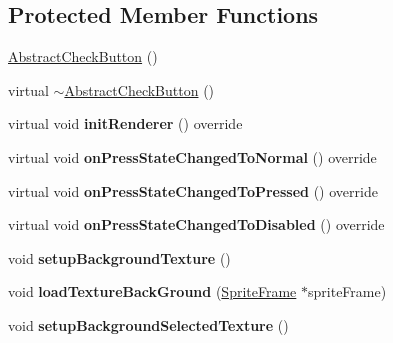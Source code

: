\subsection*{Protected Member Functions}
\begin{DoxyCompactItemize}
\item 
\hyperlink{classui_1_1AbstractCheckButton_a951d897f8066270c55a7744951b7eae1}{Abstract\+Check\+Button} ()
\item 
virtual \hyperlink{classui_1_1AbstractCheckButton_a85c1aaf7ad26be411cf5ca0d4c64b6d4}{$\sim$\+Abstract\+Check\+Button} ()
\item 
\mbox{\label{classui_1_1AbstractCheckButton_a2698a4a8e930e360a95760ba34f8912a}} 
virtual void {\bfseries init\+Renderer} () override
\item 
\mbox{\label{classui_1_1AbstractCheckButton_acb161b6c208d7d76a0330205c0111b78}} 
virtual void {\bfseries on\+Press\+State\+Changed\+To\+Normal} () override
\item 
\mbox{\label{classui_1_1AbstractCheckButton_a6f160212123aaf1ed6b9a94c3589b667}} 
virtual void {\bfseries on\+Press\+State\+Changed\+To\+Pressed} () override
\item 
\mbox{\label{classui_1_1AbstractCheckButton_a1af405ff5751bbe41262c2e777b11505}} 
virtual void {\bfseries on\+Press\+State\+Changed\+To\+Disabled} () override
\item 
\mbox{\label{classui_1_1AbstractCheckButton_a58baf970c7b93a68dd335874bebfb0b7}} 
void {\bfseries setup\+Background\+Texture} ()
\item 
\mbox{\label{classui_1_1AbstractCheckButton_aab03d9617db3263453bf660f2b1b3828}} 
void {\bfseries load\+Texture\+Back\+Ground} (\hyperlink{classSpriteFrame}{Sprite\+Frame} $\ast$sprite\+Frame)
\item 
\mbox{\label{classui_1_1AbstractCheckButton_a5b6993263a76a1270c657e62bde1b54f}} 
void {\bfseries setup\+Background\+Selected\+Texture} ()
\item 
\mbox{\label{classui_1_1AbstractCheckButton_aad9a5587fe9c73fa7797f53826cef95f}} 

\end{DoxyCompactItemize}
